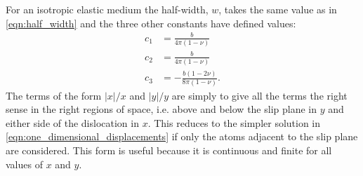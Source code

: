 For an isotropic elastic medium the half-width, $w$, takes the same value as in \autoref{eqn:half_width} and the three other constants have defined values:
\begin{subequations}\label{eqn:disloc_params}
\begin{align}
c_1 &= \frac{b}{4\pi{}(1-\nu)} \\
c_2 &= \frac{b}{4\pi{}(1-\nu)} \\
c_3 &= - \frac{b(1-2\nu)}{8\pi(1-\nu)}.
\end{align}
\end{subequations}
The terms of the form $|x|/x$ and $|y|/y$ are simply to give all the terms the right sense in the right regions of space, i.e. above and below the slip plane in $y$ and either side of the dislocation in $x$. This reduces to the simpler solution in \autoref{eqn:one_dimensional_displacements} if only the atoms adjacent to the slip plane are considered. This form is useful because it is continuous and finite for all values of $x$ and $y$. 



